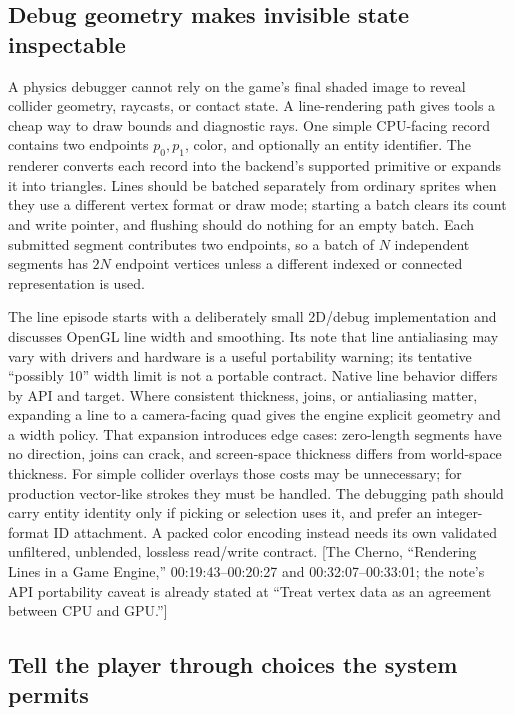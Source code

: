 \subsection{Debug geometry makes invisible state inspectable}\label{debug-geometry-makes-invisible-state-inspectable}

A physics debugger cannot rely on the game's final shaded image to reveal collider geometry, raycasts, or contact state. A line-rendering path gives tools a cheap way to draw bounds and diagnostic rays. One simple CPU-facing record contains two endpoints \(p_0,p_1\), color, and optionally an entity identifier. The renderer converts each record into the backend's supported primitive or expands it into triangles. Lines should be batched separately from ordinary sprites when they use a different vertex format or draw mode; starting a batch clears its count and write pointer, and flushing should do nothing for an empty batch. Each submitted segment contributes two endpoints, so a batch of \(N\) independent segments has \(2N\) endpoint vertices unless a different indexed or connected representation is used.

The line episode starts with a deliberately small 2D/debug implementation and discusses OpenGL line width and smoothing. Its note that line antialiasing may vary with drivers and hardware is a useful portability warning; its tentative ``possibly 10'' width limit is not a portable contract. Native line behavior differs by API and target. Where consistent thickness, joins, or antialiasing matter, expanding a line to a camera-facing quad gives the engine explicit geometry and a width policy. That expansion introduces edge cases: zero-length segments have no direction, joins can crack, and screen-space thickness differs from world-space thickness. For simple collider overlays those costs may be unnecessary; for production vector-like strokes they must be handled. The debugging path should carry entity identity only if picking or selection uses it, and prefer an integer-format ID attachment. A packed color encoding instead needs its own validated unfiltered, unblended, lossless read/write contract. {[}The Cherno, ``Rendering Lines in a Game Engine,'' 00:19:43--00:20:27 and 00:32:07--00:33:01; the note's API portability caveat is already stated at ``Treat vertex data as an agreement between CPU and GPU.''{]}

\subsection{Tell the player through choices the system permits}\label{tell-the-player-through-choices-the-system-permits}

